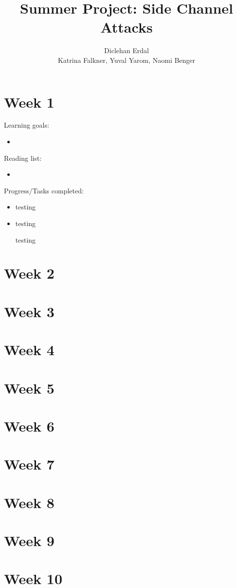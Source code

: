 \documentclass[a4paper, 10pt, envcountsect, runningheads]{article}
\begin{document}
\title{Summer Project: Side Channel Attacks}
\author{Diclehan Erdal\\ Katrina Falkner, Yuval Yarom, Naomi Benger}

\maketitle

\section*{Week 1}
Learning goals:
\begin{itemize}
\item 
\end{itemize}

Reading list:
\begin{itemize}
\item 
\end{itemize}


Progress/Tasks completed:
\begin{itemize}
\item {testing}
\item{testing}
\item[testing]
\end{itemize}


\section*{Week 2}

\section*{Week 3}

\section*{Week 4}

\section*{Week 5}

\section*{Week 6}

\section*{Week 7}

\section*{Week 8}

\section*{Week 9}

\section*{Week 10}
\end{document}
